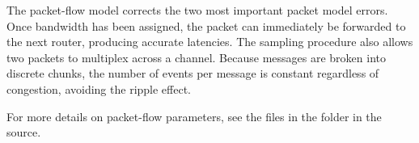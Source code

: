 The packet-flow model corrects the two most important packet model errors.
Once bandwidth has been assigned, the packet can immediately be forwarded to the next router, producing accurate latencies.
The sampling procedure also allows two packets to multiplex across a channel.
Because messages are broken into discrete chunks, the number of events per message is constant regardless of congestion, avoiding the ripple effect.

For more details on packet-flow parameters, see the  files in the  folder in the \sstmacro source.

